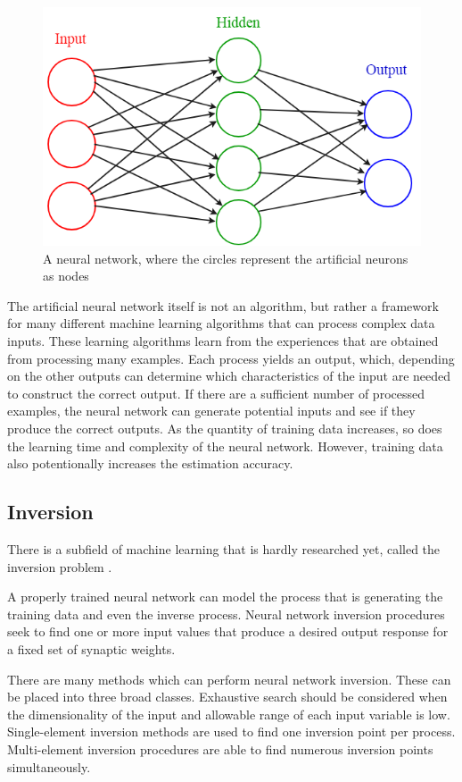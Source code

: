 \begin{figure}[h]
	\centering
	\includegraphics[height=0.35\linewidth]{./figures/feedforward}
	\caption{A neural network, where the circles represent the artificial neurons as nodes}
	\label{fig:feedforward}
\end{figure}

The artificial neural network itself is not an algorithm, but rather a framework for many different machine learning algorithms that can process complex data inputs. These learning algorithms learn from the experiences that are obtained from processing many examples. Each process yields an output, which, depending on the other outputs can determine which characteristics of the input are needed to construct the correct output. If there are a sufficient number of processed examples, the neural network can generate potential inputs and see if they produce the correct outputs. As the quantity of training data increases, so does the learning time and complexity of the neural network. However, training data also potentionally increases the estimation accuracy.



\subsection{Inversion}

There is a subfield of machine learning that is hardly researched yet, called the inversion problem \cite{KINDERMANN1990277}. \smallskip

\label{para:inversion}A properly trained neural network can model the process that is generating the training data and even the inverse process. Neural network inversion procedures seek to find one or more input values that produce a desired output response for a fixed set of synaptic weights. \medskip

There are many methods which can perform neural network inversion. These can be placed into three broad classes. Exhaustive search should be considered when the dimensionality of the input and allowable range of each input variable is low. Single-element inversion methods are used to find one inversion point per process. Multi-element inversion procedures are able to find numerous inversion points simultaneously. \medskip

